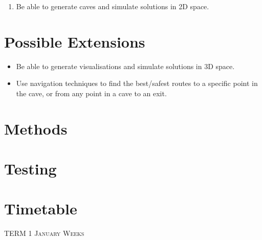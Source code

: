\documentclass{article}
\begin{document}
\begin{enumerate}
    \item Be able to generate caves and simulate solutions in 2D space.
    
\end{enumerate}


\section{Possible Extensions}

\begin{itemize}
    \item Be able to generate visualisations and simulate solutions in 3D space.
    \item Use navigation techniques to find the best/safest routes to a specific point in the cave, or from any point in a cave to an exit.
\end{itemize}

\section{Methods}

\section{Testing}

\section{Timetable}



\begin{center}
\textsc{\LARGE TERM 1} 
\textsc{\large January Weeks}
\end{center}

\begin{calendar}{\textwidth}

\day{}{}
\day{}{}
\day{}{}
\day{}{}
 
\finishCalendar
\end{calendar}
\end{document}
